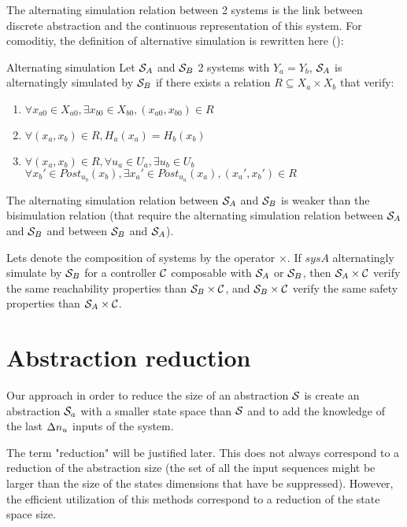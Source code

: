 The alternating simulation relation between 2 systems is the link between discrete abstraction and the continuous representation of this system.
For comoditiy, the definition of alternative simulation is rewritten here (\cite{tabuada2009verification}):
\begin{nameddef}{Alternating simulation} \label{def_alt_sim}
Let $\mathcal{S}_A$ and $\mathcal{S}_B$ 2 systems with $Y_a=Y_b$, $\mathcal{S}_A$ is alternatingly simulated by $\mathcal{S}_B$ if there exists a relation $R \subseteq X_a \times X_b$ that verify:
\begin{enumerate}
\item $\forall x_{a0} \in X_{a0}, \exists x_{b0} \in X_{b0}, (x_{a0},x_{b0}) \in R$
\item $\forall (x_a,x_b) \in R, H_a(x_a) = H_b(x_b)$
\item $\forall (x_a,x_b) \in R, \forall u_{a} \in U_{a}, \exists u_{b} \in U_{b}$\\
$\forall x_b' \in Post_{u_b}(x_b),\exists x_a' \in Post_{u_a}(x_a), (x_a',x_b') \in R$
\popQED
\end{enumerate}
\end{nameddef}
The alternating simulation relation between $\mathcal{S}_A$ and $\mathcal{S}_B$ is weaker than the bisimulation relation (that require the alternating simulation relation between $\mathcal{S}_A$ and $\mathcal{S}_B$ and between $\mathcal{S}_B$ and $\mathcal{S}_A$).

Lets denote the composition of systems by the operator $\times$.
If $sysA$ alternatingly simulate by $\mathcal{S}_B$ for a controller $\mathcal{C}$ composable with $\mathcal{S}_A$ or $\mathcal{S}_B$, then $\mathcal{S}_A \times \mathcal{C}$ verify the same reachability properties than $\mathcal{S}_B \times \mathcal{C}$, and $\mathcal{S}_B \times \mathcal{C}$ verify the same safety properties than $\mathcal{S}_A \times \mathcal{C}$.

\section{Abstraction reduction} \label{sec:abstraction}
Our approach in order to reduce the size of an abstraction $\mathcal{S}$ is create an abstraction $\mathcal{S}_a$ with a smaller state space than $\mathcal{S}$ and to add the knowledge of the last $\Delta n_u$ inputs of the system.

The term "reduction" will be justified later. This does not always correspond to a reduction of the abstraction size (the set of all the input sequences might be larger than the size of the states dimensions that have be suppressed). However, the efficient utilization of this methods correspond to a reduction of the state space size.

